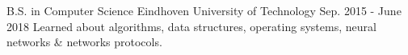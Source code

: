 
\begin{cventries}

  \cventry
    {B.S. in Computer Science} %
    {Eindhoven University of Technology} %
    {} %
    {Sep. 2015 - June 2018} %
    {
      {Learned about algorithms, data structures, operating systems, neural networks \& networks protocols.}
    }

\end{cventries}
